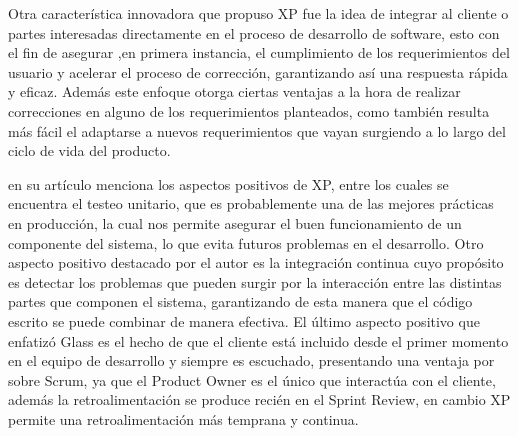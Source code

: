 \documentclass[a4paper,10pt]{article}
\begin{document}
	Otra característica innovadora que propuso XP fue la idea de integrar al cliente o partes interesadas directamente en el proceso de desarrollo de software, esto con el fin de asegurar ,en primera instancia, el cumplimiento de los requerimientos del usuario y acelerar el proceso de corrección, garantizando así una respuesta rápida y eficaz. Además este enfoque otorga ciertas ventajas a la hora de realizar correcciones en alguno de los requerimientos planteados, como también resulta más fácil el adaptarse a nuevos requerimientos que vayan surgiendo a lo largo del ciclo de vida del producto.
	
	\textcite{glass2001extreme} en su artículo menciona los aspectos positivos de XP, entre los cuales se encuentra el testeo unitario, que es probablemente una de las mejores prácticas en producción, la cual nos permite asegurar el buen funcionamiento de un componente del sistema, lo que evita futuros problemas en el desarrollo. Otro aspecto positivo destacado por el autor es la integración continua cuyo propósito es detectar los problemas que pueden surgir por la interacción entre las distintas partes que componen el sistema, garantizando de esta manera que el código escrito se puede combinar de manera efectiva. El último aspecto positivo que enfatizó Glass es el hecho de que el cliente está incluido desde el primer momento en el equipo de desarrollo y siempre es escuchado, presentando una ventaja por sobre Scrum, ya que el Product Owner es el único que interactúa con el cliente, además la retroalimentación se produce recién en el Sprint Review, en cambio XP permite una retroalimentación más temprana y continua.
	
\end{document}
